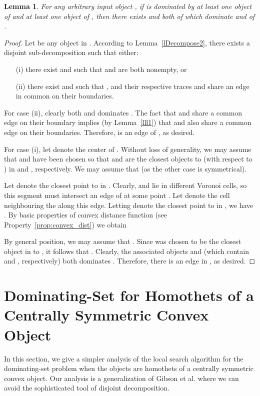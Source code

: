 \documentclass[a4paper,11pt]{article}
\newtheorem{lemma}{Lemma}
\begin{document}
\begin{lemma}\label{loc4}
  For any arbitrary input object , if  is dominated by at least one object of  and at least one object of , then there exists  and  both of which dominate  and   of .
 \end{lemma}
 \begin{proof}
  Let  be any object in .
According to Lemma~\ref{lDecompose2}, there exists a disjoint sub-decomposition
 such that either:
\begin{itemize}
 \item[(i)]  there exist   and 
 such that   and   are both nonempty, or 
 \item[(ii)]  there exist 
  and 
 such that  , and their respective traces
 and  share an edge in common on their boundaries.
\end{itemize}

For case (ii), clearly both  and  dominates . The fact that  and  share a common edge on their boundary implies (by Lemma~\ref{lll1}) that  and  also share a common edge on their boundaries. 
Therefore,  is an edge of , as desired. 

For case (i), let  denote the center of . 
Without loss of generality, we may assume that  and  have been chosen so that  and  are the closest objects to  (with respect to ) in  and , respectively. 
We may assume that  (as the other case is symmetrical). 

Let  denote the closest point to  in . 
Clearly,  and  lie in different Voronoi cells, so this segment must intersect an edge of  at some point . Let  denote the cell neighbouring the  along this edge. Letting  denote the closest point to  in , we have . By basic properties of convex distance function (see Property~\ref{prop:convex_dist}) we obtain 

By general position, we may assume that .
Since  was chosen to be the closest object in  to , it follows that . 
Clearly, the associated objects  and  (which contain  and , respectively) both dominates .
Therefore, there is an edge  in , as desired. 
\end{proof}



\section{Dominating-Set for Homothets of a Centrally Symmetric Convex Object}\label{Appendix}
In this section, we give a simpler analysis of the local search algorithm for the dominating-set problem when 
the objects are homothets of a centrally symmetric  convex object.  Our analysis is a generalization of Gibson et al. \cite{GibsonP10} where we can avoid the sophisticated tool of disjoint decomposition. 
\end{document}
